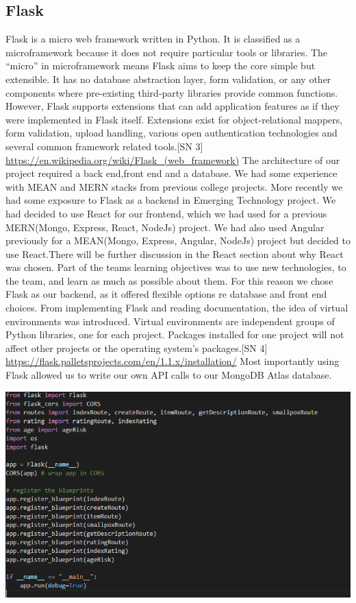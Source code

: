 \subsection{Flask}
Flask is a micro web framework written in Python. It is classified as a microframework because it does not require particular tools or libraries. The “micro” in microframework means Flask aims to keep the core simple but extensible. It has no database abstraction layer, form validation, or any other components where pre-existing third-party libraries provide common functions. However, Flask supports extensions that can add application features as if they were implemented in Flask itself. Extensions exist for object-relational mappers, form validation, upload handling, various open authentication technologies and several common framework related tools.[SN 3] \url{https://en.wikipedia.org/wiki/Flask_(web_framework)}
The architecture of our project required a back end,front end and a database. We had some experience with MEAN and MERN stacks from previous college projects. More recently we had some exposure to Flask as a backend in Emerging Technology project. We had decided to use React for our frontend, which we had used for a previous MERN(Mongo, Express, React, NodeJs) project. We had also used Angular previously for a MEAN(Mongo, Express, Angular, NodeJs) project but decided to use React.There will be further discussion in the React section about why React was chosen. Part of the teams learning objectives was to use new technologies, to the team, and learn as much as possible about them. For this reason we chose Flask as our backend, as it offered flexible options re database and front end choices. From implementing Flask and reading documentation, the idea of virtual environments was introduced. Virtual environments are independent groups of Python libraries, one for each project. Packages installed for one project will not affect other projects or the operating system’s packages.[SN 4] \url{https://flask.palletsprojects.com/en/1.1.x/installation/}
Most importantly using Flask allowed us to write our own API calls to our MongoDB Atlas database.

\begin{center}    
      \includegraphics[scale=0.7]{img/flask.PNG}
\end{center}

